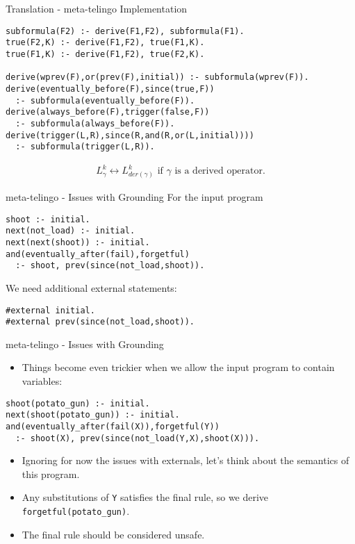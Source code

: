 \documentclass[aspectratio=169,xcolor=svgnames]{beamer}
\theoremstyle{theoremstyle_space}
\begin{document}
\begin{frame}[t,fragile]{Translation - meta-telingo Implementation}
    \begin{lstlisting}[]
subformula(F2) :- derive(F1,F2), subformula(F1).
true(F2,K) :- derive(F1,F2), true(F1,K).
true(F1,K) :- derive(F1,F2), true(F2,K).

derive(wprev(F),or(prev(F),initial)) :- subformula(wprev(F)).
derive(eventually_before(F),since(true,F)) 
  :- subformula(eventually_before(F)).
derive(always_before(F),trigger(false,F)) 
  :- subformula(always_before(F)).
derive(trigger(L,R),since(R,and(R,or(L,initial)))) 
  :- subformula(trigger(L,R)).
    \end{lstlisting}
\begin{align*}
L^k_{\gamma} \leftrightarrow L^k_{der(\gamma)} \text{ if } \gamma \text{ is a derived operator.}
\end{align*}
\end{frame}

\begin{frame}[t,fragile]{meta-telingo - Issues with Grounding}
For the input program
\begin{lstlisting}[language=clingo,numbers=none]
shoot :- initial.
next(not_load) :- initial.
next(next(shoot)) :- initial.
and(eventually_after(fail),forgetful)
  :- shoot, prev(since(not_load,shoot)).
\end{lstlisting}
We need additional external statements:
\begin{lstlisting}[language=clingo,numbers=none]
#external initial.
#external prev(since(not_load,shoot)).
\end{lstlisting}
\end{frame}

\begin{frame}[t,fragile]{meta-telingo - Issues with Grounding}
  \begin{itemize}
  \item Things become even trickier when we allow the input program to contain variables:
  \end{itemize}
\begin{lstlisting}[language=clingo,numbers=none]
shoot(potato_gun) :- initial.
next(shoot(potato_gun)) :- initial.
and(eventually_after(fail(X)),forgetful(Y)) 
  :- shoot(X), prev(since(not_load(Y,X),shoot(X))).
\end{lstlisting}
\begin{itemize}
\item Ignoring for now the issues with externals, let's think about
  the semantics of this program.
\item Any substitutions of \verb|Y| satisfies the final rule, so we
  derive \verb|forgetful(potato_gun)|.
\item The final rule should be considered unsafe.
\end{itemize}
\end{frame}
\end{document}
